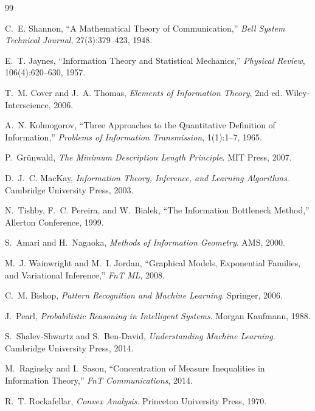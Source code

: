 \documentclass[12pt, oneside]{article}
\theoremstyle{plain}
\theoremstyle{definition}
\theoremstyle{remark}
\begin{document}
\newpage
\begin{thebibliography}{99}

C.~E. Shannon,
``A Mathematical Theory of Communication,''
\textit{Bell System Technical Journal}, 27(3):379--423, 1948.

E.~T. Jaynes,
``Information Theory and Statistical Mechanics,''
\textit{Physical Review}, 106(4):620--630, 1957.

T.~M. Cover and J.~A. Thomas,
\textit{Elements of Information Theory}, 2nd ed.
Wiley-Interscience, 2006.

A.~N. Kolmogorov,
``Three Approaches to the Quantitative Definition of Information,''
\textit{Problems of Information Transmission}, 1(1):1--7, 1965.

P.~Gr\"unwald,
\textit{The Minimum Description Length Principle}.
MIT Press, 2007.

D.~J.~C. MacKay,
\textit{Information Theory, Inference, and Learning Algorithms}.
Cambridge University Press, 2003.

N.~Tishby, F.~C. Pereira, and W.~Bialek,
``The Information Bottleneck Method,''
Allerton Conference, 1999.

S.~Amari and H.~Nagaoka,
\textit{Methods of Information Geometry}.
AMS, 2000.

M.~J. Wainwright and M.~I. Jordan,
``Graphical Models, Exponential Families, and Variational Inference,''
\textit{FnT ML}, 2008.

C.~M. Bishop,
\textit{Pattern Recognition and Machine Learning}.
Springer, 2006.

J.~Pearl,
\textit{Probabilistic Reasoning in Intelligent Systems}.
Morgan Kaufmann, 1988.

S.~Shalev-Shwartz and S.~Ben-David,
\textit{Understanding Machine Learning}.
Cambridge University Press, 2014.

M.~Raginsky and I.~Sason,
``Concentration of Measure Inequalities in Information Theory,''
\textit{FnT Communications}, 2014.

R.~T. Rockafellar,
\textit{Convex Analysis}.
Princeton University Press, 1970.


\end{thebibliography}
\end{document}
